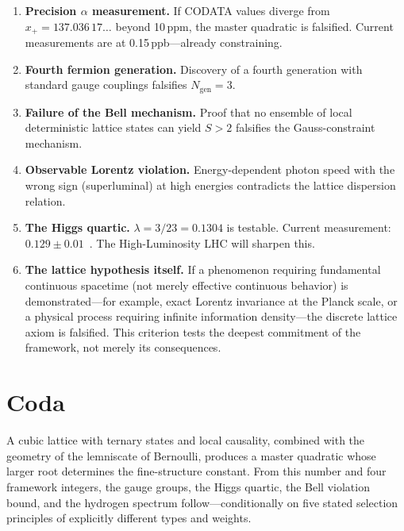 \documentclass[12pt]{article}
\theoremstyle{compact}
\begin{document}
\begin{enumerate}[nosep]
\item \textbf{Precision $\alpha$ measurement.} If CODATA values diverge from $x_+ = 137.036\,17\ldots$ beyond 10\,ppm, the master quadratic is falsified. Current measurements are at 0.15\,ppb---already constraining.

\item \textbf{Fourth fermion generation.} Discovery of a fourth generation with standard gauge couplings falsifies $N_{\mathrm{gen}} = 3$.

\item \textbf{Failure of the Bell mechanism.} Proof that no ensemble of local deterministic lattice states can yield $S > 2$ falsifies the Gauss-constraint mechanism.

\item \textbf{Observable Lorentz violation.} Energy-dependent photon speed with the wrong sign (superluminal) at high energies contradicts the lattice dispersion relation.

\item \textbf{The Higgs quartic.} $\lambda = 3/23 = 0.1304$ is testable. Current measurement: $0.129 \pm 0.01$~\cite{cms_higgs}. The High-Luminosity LHC will sharpen this.

\item \textbf{The lattice hypothesis itself.} If a phenomenon requiring fundamental continuous spacetime (not merely effective continuous behavior) is demonstrated---for example, exact Lorentz invariance at the Planck scale, or a physical process requiring infinite information density---the discrete lattice axiom is falsified. This criterion tests the deepest commitment of the framework, not merely its consequences.
\end{enumerate}


\section*{Coda}

A cubic lattice with ternary states and local causality, combined with the geometry of the lemniscate of Bernoulli, produces a master quadratic whose larger root determines the fine-structure constant. From this number and four framework integers, the gauge groups, the Higgs quartic, the Bell violation bound, and the hydrogen spectrum follow---conditionally on five stated selection principles of explicitly different types and weights.
\end{document}

